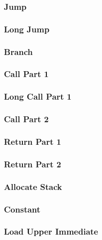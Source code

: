 \documentclass{article}
\begin{document}
		\subsubsection{Jump}
		\subsubsection{Long Jump}
		\subsubsection{Branch}
		\subsubsection{Call Part 1}
		\subsubsection{Long Call Part 1}
		\subsubsection{Call Part 2}
		\subsubsection{Return Part 1}
		\subsubsection{Return Part 2}
		\subsubsection{Allocate Stack}
		\subsubsection{Constant}
		\subsubsection{Load Upper Immediate}
\end{document}
